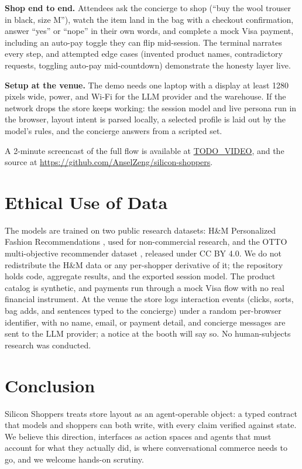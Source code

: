 \documentclass[sigconf, screen, review]{acmart}
\begin{document}
\textbf{Shop end to end.} Attendees ask the concierge to shop (``buy the wool trouser in black, size M''), watch the item land in the bag with a checkout confirmation, answer ``yes'' or ``nope'' in their own words, and complete a mock Visa payment, including an auto-pay toggle they can flip mid-session. The terminal narrates every step, and attempted edge cases (invented product names, contradictory requests, toggling auto-pay mid-countdown) demonstrate the honesty layer live.

\textbf{Setup at the venue.} The demo needs one laptop with a display at least 1280 pixels wide, power, and Wi-Fi for the LLM provider and the warehouse. If the network drops the store keeps working: the session model and live persona run in the browser, layout intent is parsed locally, a selected profile is laid out by the model's rules, and the concierge answers from a scripted set.

A 2-minute screencast of the full flow is available at \url{TODO_VIDEO}, and the source at \url{https://github.com/AnselZeng/silicon-shoppers}.

\section{Ethical Use of Data}

The models are trained on two public research datasets: H\&M Personalized Fashion Recommendations \cite{hmdataset}, used for non-commercial research, and the OTTO multi-objective recommender dataset \cite{otto}, released under CC BY 4.0. We do not redistribute the H\&M data or any per-shopper derivative of it; the repository holds code, aggregate results, and the exported session model. The product catalog is synthetic, and payments run through a mock Visa flow with no real financial instrument. At the venue the store logs interaction events (clicks, sorts, bag adds, and sentences typed to the concierge) under a random per-browser identifier, with no name, email, or payment detail, and concierge messages are sent to the LLM provider; a notice at the booth will say so. No human-subjects research was conducted.

\section{Conclusion}

Silicon Shoppers treats store layout as an agent-operable object: a typed contract that models and shoppers can both write, with every claim verified against state. We believe this direction, interfaces as action spaces and agents that must account for what they actually did, is where conversational commerce needs to go, and we welcome hands-on scrutiny.
\end{document}

